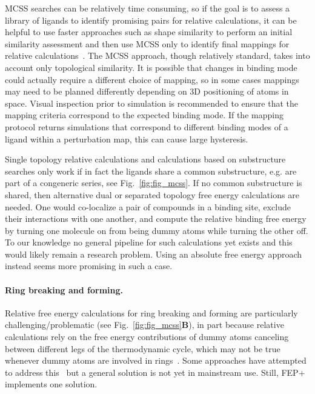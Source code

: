 \documentclass[9pt,bestpractices,pubversion]{livecoms}
\begin{document}
MCSS searches can be relatively time consuming, so if the goal is to assess a library of ligands to identify promising pairs for relative calculations, it can be helpful to use faster approaches such as shape similarity to perform an initial similarity assessment and then use MCSS only to identify final mappings for relative calculations~\cite{raymond2002maximum,klabunde2012mars,jones2009elucidating}. The MCSS approach, though relatively standard, takes into account only topological similarity. It is possible that changes in binding mode could actually require a different choice of mapping, so in some cases mappings may need to be planned differently depending on 3D positioning of atoms in space. Visual inspection prior to simulation is recommended to ensure that the mapping criteria correspond to the expected binding mode. If the mapping protocol returns simulations that correspond to different binding modes of a ligand within a perturbation map, this can cause large hysteresis.

Single topology relative calculations and calculations based on substructure searches only work if in fact the ligands share a common substructure, e.g. are part of a congeneric series, see Fig.~\ref{fig:fig_mcss}.
If no common substructure is shared, then alternative dual or separated topology free energy calculations are needed. One would co-localize a pair of compounds in a binding site, exclude their interactions with one another, and compute the relative binding free energy by turning one molecule on from being dummy atoms while turning the other off.
To our knowledge no general pipeline for such calculations yet exists and this would likely remain a research problem. Using an absolute free energy approach instead seems more promising in such a case. 

\paragraph{Ring breaking and forming.} Relative free energy calculations for ring breaking and forming are particularly challenging/problematic (see Fig.~\ref{fig:fig_mcss}\textbf{B}), in part because relative calculations rely on the free energy contributions of dummy atoms canceling between different legs of the thermodynamic cycle, which may not be true whenever dummy atoms are involved in rings~\cite{liu2015ring}.
Some approaches have attempted to address this~\cite{clark2019relative} but a general solution is not yet in mainstream use. Still, FEP+ implements one solution.
\end{document}
